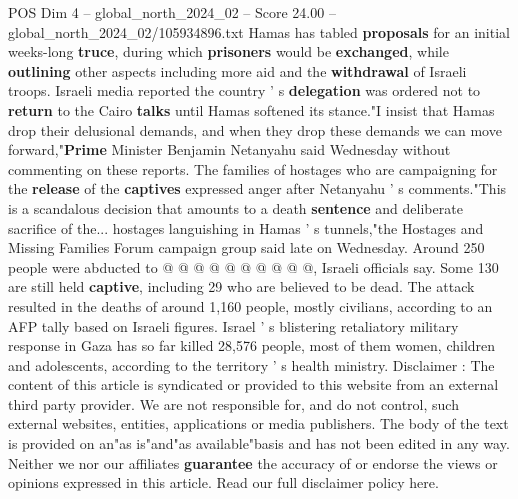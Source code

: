 \begin{textsample}{POS Dim 4 – global\_north\_2024\_02 – Score 24.00 – global\_north\_2024\_02/105934896.txt}
Hamas has tabled \textbf{proposals} for an initial weeks-long \textbf{truce}, during which \textbf{prisoners} would be \textbf{exchanged}, while \textbf{outlining} other aspects including more aid and the \textbf{withdrawal} of Israeli troops.
Israeli media reported the country ' s \textbf{delegation} was ordered not to \textbf{return} to the Cairo \textbf{talks} until Hamas softened its stance."I insist that Hamas drop their delusional demands, and when they drop these demands we can move forward,"\textbf{Prime} Minister Benjamin Netanyahu said Wednesday without commenting on these reports.
The families of hostages who are campaigning for the \textbf{release} of the \textbf{captives} expressed anger after Netanyahu ' s comments."This is a scandalous decision that amounts to a death \textbf{sentence} and deliberate sacrifice of the... hostages languishing in Hamas ' s tunnels,"the Hostages and Missing Families Forum campaign group said late on Wednesday.
Around 250 people were abducted to @ @ @ @ @ @ @ @ @ @, Israeli officials say.
Some 130 are still held \textbf{captive}, including 29 who are believed to be dead.
The attack resulted in the deaths of around 1,160 people, mostly civilians, according to an AFP tally based on Israeli figures.
Israel ' s blistering retaliatory military response in Gaza has so far killed 28,576 people, most of them women, children and adolescents, according to the territory ' s health ministry.
Disclaimer : The content of this article is syndicated or provided to this website from an external third party provider.
We are not responsible for, and do not control, such external websites, entities, applications or media publishers.
The body of the text is provided on an"as is"and"as available"basis and has not been edited in any way.
Neither we nor our affiliates \textbf{guarantee} the accuracy of or endorse the views or opinions expressed in this article.
Read our full disclaimer policy here.

\end{textsample}
